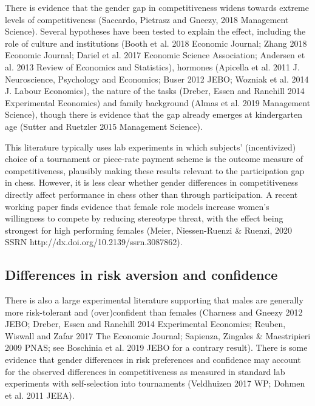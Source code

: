 There is evidence that the gender gap in competitiveness widens towards extreme levels of competitiveness (Saccardo, Pietrasz and Gneezy, 2018 Management Science). Several hypotheses have been tested to explain the effect, including the role of culture and institutions (Booth et al. 2018 Economic Journal; Zhang 2018 Economic Journal; Dariel et al. 2017 Economic Science Association; Andersen et al. 2013 Review of Economics and Statistics), hormones (Apicella et al. 2011 J. Neuroscience, Psychology and Economics; Buser 2012 JEBO; Wozniak et al. 2014 J. Labour Economics), the nature of the tasks (Dreber, Essen and Ranehill 2014 Experimental Economics) and family background (Almas et al. 2019 Management Science), though there is evidence that the gap already emerges at kindergarten age (Sutter and Ruetzler 2015 Management Science).

This literature typically uses lab experiments in which subjects' (incentivized) choice of a tournament or piece-rate payment scheme is the outcome measure of competitiveness, plausibly making these results relevant to the participation gap in chess. However, it is less clear whether gender differences in competitiveness directly affect performance in chess other than through participation. A recent working paper finds evidence that female role models increase women's willingness to compete by reducing stereotype threat, with the effect being strongest for high performing females (Meier, Niessen-Ruenzi & Ruenzi, 2020 SSRN http://dx.doi.org/10.2139/ssrn.3087862).




\subsection*{Differences in risk aversion and confidence}
There is also a large experimental literature supporting that males are generally more risk-tolerant and (over)confident than females (Charness and Gneezy 2012 JEBO; Dreber, Essen and Ranehill 2014 Experimental Economics; Reuben, Wiswall and Zafar 2017 The Economic Journal; Sapienza, Zingales & Maestripieri 2009 PNAS; see Boschinia et al. 2019 JEBO for a contrary result). There is some evidence that gender differences in risk preferences and confidence may account for the observed differences in competitiveness as measured in standard lab experiments with self-selection into tournaments (Veldhuizen 2017 WP; Dohmen et al. 2011 JEEA). 

